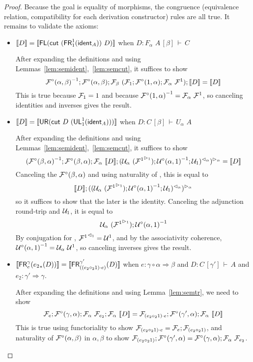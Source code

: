 \documentclass{drl-common/llncs}
\renewcommand{\sem}[1]{\ensuremath{ \llbracket #1 \rrbracket}}
\newcommand{\inv}[1]{\ensuremath{{#1}^{-1}}}
\newcommand{\tc}[2]{\ensuremath{#1 \Rightarrow #2}}
\newcommand\compo[2]{\ensuremath{#1 \circ #2}}
\newcommand\compv[2]{\ensuremath{#1 \cdot #2}}
\newcommand\comph[2]{\ensuremath{#1 \mathbin{\circ_2} #2}}
\newcommand\F[2]{\ensuremath{F_{#1} \,\, #2}}
\newcommand\U[2]{\ensuremath{U_{#1} \,\, #2}}
\newcommand\seq[3]{\ensuremath{#1 \, [ #2 ] \, \vdash \, #3}}
\newcommand\tr[2]{\ensuremath{{{#1}_{*}(#2)}}}
\newcommand\ident[1]{\ensuremath{\dsd{ident}_{#1}}}
\newcommand\cutsym{\ensuremath{\dsd{cut}}}
\newcommand\cut[2]{\ensuremath{{\cutsym \,\, #1 \,\, #2}}}
\newcommand\UL[3]{\ensuremath{\dsd{UL}^{#1}_{#2}(#3)}}
\newcommand\FR[3]{\ensuremath{\dsd{FR}^{#1}_{#2}(#3)}}
\newcommand\FL[1]{\ensuremath{\dsd{FL}(#1)}}
\newcommand\UR[1]{\ensuremath{\dsd{UR}(#1)}}
\begin{document}
\begin{proof}
Because the goal is equality of morphisms, the congruence (equivalence
relation, compatibility for each derivation constructor) rules are all
true.  It remains to validate the axioms:

\begin{itemize}
\item $\sem{D} = \sem{\FL {\cut{(\FR 1 1 {\ident{A}})}{D}} }$
when ${D : \seq{\F \alpha A}{\beta}{C}}$

After expanding the definitions and using
Lemmas~\ref{lem:semident},~\ref{lem:semcut}, it suffices to show
\[
\inv{\semFcomp(\alpha,\beta)};\semFcomp(\alpha,\beta);\semF{\beta}{(\semFo{1};\semFcomp(1,\alpha);\semF{\alpha}{\semFone})};\sem{D}
= \sem{D}
\]
This is true because ${\mathcal{F}_{1}} = 1$ and because
$\inv{\semFcomp(1,\alpha)} = \semF{\alpha}{\semFone}$, so canceling
identities and inverses gives the result.  

\item $\sem{D} = \sem{\UR {\cut{D}{(\UL 1 1 {\ident{A}})}}}$
when ${D : \seq{C}{\beta}{\U \alpha A}}$

After expanding the definitions and using
Lemmas~\ref{lem:semident},~\ref{lem:semcut}, it suffices to show
\[
\semltor{(\inv{\semFcomp(\beta,\alpha)};\semFcomp(\beta,\alpha);\semF{\alpha}{\sem D};\semrtol{(\semU{\alpha}{(\semltor{\semFone}{1})};\inv{\semUcomp(\alpha,1)};\semUo{1})}{\alpha})}{\alpha}
= \sem{D}
\]
Canceling the $\mathcal{F}^\circ(\beta,\alpha)$ and using naturality of
\semltor{-}{\alpha}, this is equal to
\[
\sem{D};\semltor{(\semrtol{(\semU{\alpha}{(\semltor{\semFone}{1})};\inv{\semUcomp(\alpha,1)};\semUo{1})}{\alpha})}{\alpha}
\]
so it suffices to show that the later is the identity.  Canceling the
adjunction round-trip and $\mathcal{U}_{1}$, it is equal to
\[
\semU{\alpha}{(\semltor{\semFone}{1})};\inv{\semUcomp(\alpha,1)}
\]
By conjugation for \semFone, ${\mathcal{F}^1}^{\vartriangleleft_{1}} = {\mathcal{U}^1}$, and by
the associativity coherence, $\inv{\semUcomp(\alpha,1)} =
\semU{\alpha}{\semUone}$, so canceling inverses gives the result.  

\item $\sem{{\FR{\gamma}{e}{\tr{e_2}{D}}}} = \sem{\FR{\gamma'}{(\compv{(\comph{e_2}{1})}{e})}{D}}$
when $e : \tc{\compo{\gamma}{\alpha}}{\beta}$
and $D : \seq{C}{\gamma'}{A}$
and $e_2 : \tc{\gamma'}{\gamma}$.

After expanding the definitions and using Lemma~\ref{lem:semtr}, we need
to show
\[
\semFo{e};\semFcomp(\gamma,\alpha);\semF{\alpha}{\semFo{e_2}};\semF{\alpha}{\sem{D}}
= \semFo{\compv{(\comph{e_2}{1})}{e}};\semFcomp(\gamma',\alpha);\semF{\alpha}{\sem{D}}
\]
This is true using functoriality to show $\semFo{\compv{(\comph{e_2}{1})}{e}} =
\semFo{e};\semFo{{(\comph{e_2}{1})}}$,
and naturality of $\mathcal{F}^\circ(\alpha,\beta)$ in $\alpha,\beta$ to show
$\semFo{{(\comph{e_2}{1})}};\semFcomp(\gamma',\alpha) =
\semFcomp(\gamma,\alpha);\semF{\alpha}{\semFo{e_2}}$.  
  


\end{itemize}
\end{proof}
\end{document}
